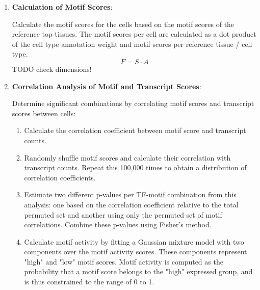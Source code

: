 \begin{enumerate}
    \item \textbf{Calculation of Motif Scores}:
    
    Calculate the motif scores for the cells based on the motif scores of the reference top tissues. The motif scores per cell are calculated as a dot product of the cell type annotation weight and motif scores per reference tissue / cell type.
    \begin{equation*}
        F = S \cdot A
    \end{equation*}
    TODO check dimensions!

    \item \textbf{Correlation Analysis of Motif and Transcript Scores}:
    
    Determine significant combinations by correlating motif scores and transcript scores between cells:
    \begin{enumerate}
        \item Calculate the correlation coefficient between motif score and transcript counts.
        \item Randomly shuffle motif scores and calculate their correlation with transcript counts. Repeat this 100,000 times to obtain a distribution of correlation coefficients.
        \item Estimate two different p-values per TF-motif combination from this analysis: one based on the correlation coefficient relative to the total permuted set and another using only the permuted set of motif correlations. Combine these p-values using Fisher's method.
        \item Calculate motif activity by fitting a Gaussian mixture model with two components over the motif activity scores. These components represent "high" and "low" motif scores. Motif activity is computed as the probability that a motif score belongs to the "high" expressed group, and is thus constrained to the range of 0 to 1.
    \end{enumerate}
\end{enumerate}

